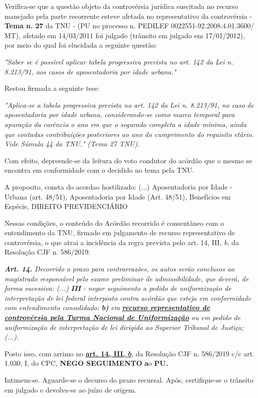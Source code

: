 \documentclass[12pt]{article}
\begin{document}
\justifying
\noindent Verifica-se que a questão objeto da controvérsia jurídica suscitada no recurso manejado pela parte recorrente esteve afetada no representativo da controvérsia - \textbf{Tema n. }\textbf{27} da TNU - (PU no processo n. PEDILEF 0022551-92.2008.4.01.3600/ MT),  afetado em 14/03/2011 foi julgado (trânsito em julgado em 17/01/2012), por meio do qual foi elucidada a seguinte questão:

\noindent \textit{"Saber se é possível aplicar tabela progressiva prevista no art. 142 da Lei n. 8.213/91, aos casos de aposentadoria por idade urbana."}

\noindent Restou firmada a seguinte tese:

\noindent \textit{"Aplica-se a tabela progressiva prevista no art. 142 da Lei n. 8.213/91, no caso de aposentadoria por idade urbana, considerando-se como marco temporal para apuração da carência o ano em que o segurado completa a idade mínima, ainda que contadas contribuições posteriores ao ano do cumprimento do requisito etário. Vide Súmula 44 da TNU." (Tema 27 TNU).}

\noindent Com efeito, depreende-se da leitura do voto condutor do acórdão que o mesmo se encontra em conformidade com o decidido no  tema pela TNU.

\noindent A proposito, consta do acordao hostilizado: (...) Aposentadoria por Idade - Urbana (art. 48/51), Aposentadoria por Idade (Art. 48/51), Benefícios em Espécie, DIREITO PREVIDENCIÁRIO

\noindent Nessas condições, o conteúdo do Acórdão recorrido é consentâneo com o entendimento da TNU, firmado em julgamento de recurso representativo de controvérsia, o que atrai a incidência da regra prevista pelo art. 14, III, \textit{b,} da Resolução CJF n. 586/2019:

\noindent \textit{\textbf{Art. 14.}}\textit{ Decorrido o prazo para contrarrazões, os autos serão conclusos ao magistrado responsável pelo exame preliminar de admissibilidade, que deverá, de forma sucessiva: (...) }\textit{\textbf{III }}\textit{- negar seguimento a pedido de uniformização de interpretação de lei federal interposto contra acórdão que esteja em conformidade com entendimento consolidado: }\textit{\textbf{b)}}\textit{ em }\uline{\textit{\textbf{recurso representativo de controvérsia pela Turma Nacional de Uniformização}}}\textit{ ou em pedido de uniformização de interpretação de lei dirigido ao Superior Tribunal de Justiça;(...).}

\noindent Posto isso, com arrimo no \uline{\textbf{art. 14, III, }}\uline{\textit{\textbf{b}}}\textit{,} da Resolução CJF n. 586/2019 c/c art. 1.030, I, do CPC, \textbf{NEGO SEGUIMENTO }\textbf{a}o\textbf{ PU}\textbf{.}

\noindent Intimem-se. Aguarde-se o decurso do prazo recursal. Após, certifique-se o trânsito em julgado e devolva-se ao juízo de origem.
\end{document}
